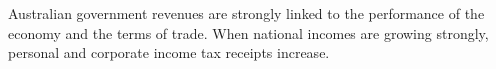 \documentclass{article}
\begin{document}
Australian government revenues are strongly linked to the performance of the economy and the terms of trade. When national incomes are growing strongly, personal and corporate income tax receipts increase.
\end{document}
